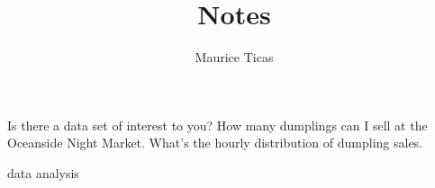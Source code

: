 \message{ !name(p.tex)}\documentclass[12pt]{amsart} \usepackage{amscd} \usepackage{epsfig}
\begin{document}

\title{Notes}

\author{Maurice Ticas}
\maketitle

Is there a data set of interest to you?
How many dumplings can I sell at the Oceanside Night Market.  What's the hourly distribution of dumpling sales.

data analysis 

\end{document}
